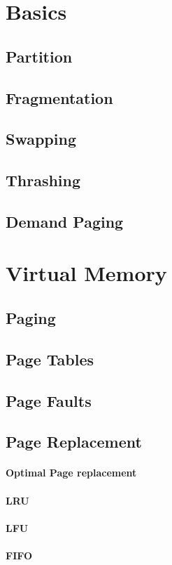 \section{Basics}
\subsection{Partition}
\subsection{Fragmentation}
\subsection{Swapping}
\subsection{Thrashing}
\subsection{Demand Paging}
\section{Virtual Memory}
\subsection{Paging}
\subsection{Page Tables}
\subsection{Page Faults}
\subsection{Page Replacement}
\paragraph{Optimal Page replacement}
\paragraph{LRU}
\paragraph{LFU}
\paragraph{FIFO}
